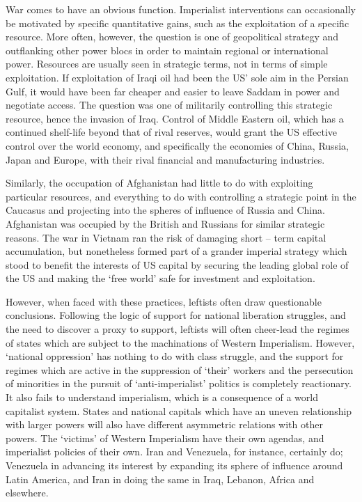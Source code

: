 War comes to have an obvious function.
Imperialist interventions can occasionally be motivated by specific quantitative gains, such as the exploitation of a specific resource.
More often, however, the question is one of geopolitical strategy and outflanking other power blocs in order to maintain regional or international power.
Resources are usually seen in strategic terms, not in terms of simple exploitation.
If exploitation of Iraqi oil had been the US’ sole aim in the Persian Gulf, it would have been far cheaper and easier to leave Saddam in power and negotiate access.
The question was one of militarily controlling this strategic resource, hence the invasion of Iraq.
Control of Middle Eastern oil, which has a continued shelf-life beyond that of rival reserves, would grant the US effective control over the world economy, and specifically the economies of China, Russia, Japan and Europe, with their rival financial and manufacturing industries.

Similarly, the occupation of Afghanistan had little to do with exploiting particular resources, and everything to do with controlling a strategic point in the Caucasus and projecting into the spheres of influence of Russia and China.
Afghanistan was occupied by the British and Russians for similar strategic reasons.
The war in Vietnam ran the risk of damaging short – term capital accumulation, but nonetheless formed part of a grander imperial strategy which stood to benefit the interests of US capital by securing the leading global role of the US and making the ‘free world’ safe for investment and exploitation.

However, when faced with these practices, leftists often draw questionable conclusions.
Following the logic of support for national liberation struggles, and the need to discover a proxy to support, leftists will often cheer-lead the regimes of states which are subject to the machinations of Western Imperialism.
However, ‘national oppression’ has nothing to do with class struggle, and the support for regimes which are active in the suppression of ‘their’ workers and the persecution of minorities in the pursuit of ‘anti-imperialist’ politics is completely reactionary.
It also fails to understand imperialism, which is a consequence of a world capitalist system.
States and national capitals which have an uneven relationship with larger powers will also have different asymmetric relations with other powers.
The ‘victims’ of Western Imperialism have their own agendas, and imperialist policies of their own.
Iran and Venezuela, for instance, certainly do; Venezuela in advancing its interest by expanding its sphere of influence around Latin America, and Iran in doing the same in Iraq, Lebanon, Africa and elsewhere.

